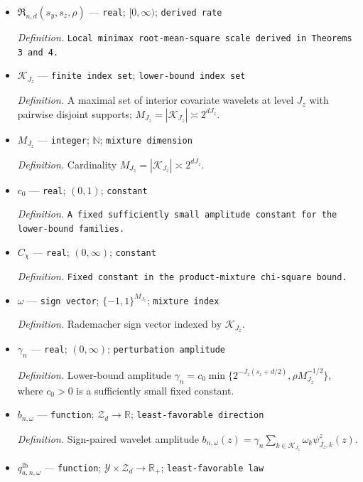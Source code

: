 \documentclass{article}
\begin{document}
\begin{itemize}
  \item \(\mathfrak R_{n,d}(s_y,s_z,\rho)\) --- \texttt{real}; \([0,\infty)\); \texttt{derived rate}
  \par\smallskip\noindent\emph{Definition.} \texttt{Local minimax root-\allowbreak{}mean-\allowbreak{}square scale derived in Theorems 3 and 4.}
  \item \(\mathcal K_{J_z}\) --- \texttt{finite index set}; \texttt{lower-\allowbreak{}bound index set}
  \par\smallskip\noindent\emph{Definition.} A maximal set of interior covariate wavelets at level \(J_z\) with pairwise disjoint supports; \(M_{J_z}=|\mathcal K_{J_z}|\asymp2^{dJ_z}\).
  \item \(M_{J_z}\) --- \texttt{integer}; \(\mathbb N\); \texttt{mixture dimension}
  \par\smallskip\noindent\emph{Definition.} Cardinality \(M_{J_z}=|\mathcal K_{J_z}|\asymp2^{dJ_z}\).
  \item \(c_0\) --- \texttt{real}; \((0,1)\); \texttt{constant}
  \par\smallskip\noindent\emph{Definition.} \texttt{A fixed sufficiently small amplitude constant for the lower-\allowbreak{}bound families.}
  \item \(C_{\chi}\) --- \texttt{real}; \((0,\infty)\); \texttt{constant}
  \par\smallskip\noindent\emph{Definition.} \texttt{Fixed constant in the product-\allowbreak{}mixture chi-\allowbreak{}square bound.}
  \item \(\omega\) --- \texttt{sign vector}; \(\{-1,1\}^{M_{J_z}}\); \texttt{mixture index}
  \par\smallskip\noindent\emph{Definition.} Rademacher sign vector indexed by \(\mathcal K_{J_z}\).
  \item \(\gamma_n\) --- \texttt{real}; \((0,\infty)\); \texttt{perturbation amplitude}
  \par\smallskip\noindent\emph{Definition.} Lower-bound amplitude \(\gamma_n=c_0\min\{2^{-J_z(s_z+d/2)},\rho M_{J_z}^{-1/2}\}\), where \(c_0>0\) is a sufficiently small fixed constant.
  \item \(b_{n,\omega}\) --- \texttt{function}; \(\mathcal Z_d\to\mathbb R\); \texttt{least-\allowbreak{}favorable direction}
  \par\smallskip\noindent\emph{Definition.} Sign-paired wavelet amplitude \(b_{n,\omega}(z)=\gamma_n\sum_{k\in\mathcal K_{J_z}}\omega_k\psi^z_{J_z,k}(z)\).
  \item \(q_{a,n,\omega}^{\mathrm{lb}}\) --- \texttt{function}; \(\mathcal Y\times\mathcal Z_d\to\mathbb R_+\); \texttt{least-\allowbreak{}favorable law}

\end{itemize}
\end{document}
